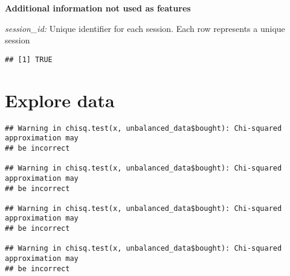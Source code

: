 \documentclass[
]{book}
\newenvironment{Shaded}{\begin{snugshade}}{\end{snugshade}}
\newcommand{\CommentTok}[1]{\textcolor[rgb]{0.56,0.35,0.01}{\textit{#1}}}
\newcommand{\ControlFlowTok}[1]{\textcolor[rgb]{0.13,0.29,0.53}{\textbf{#1}}}
\newcommand{\FunctionTok}[1]{\textcolor[rgb]{0.00,0.00,0.00}{#1}}
\newcommand{\NormalTok}[1]{#1}
\newcommand{\OtherTok}[1]{\textcolor[rgb]{0.56,0.35,0.01}{#1}}
\newcommand{\SpecialCharTok}[1]{\textcolor[rgb]{0.00,0.00,0.00}{#1}}
\begin{document}
\textbf{Additional information not used as features}

\emph{session\_id:} Unique identifier for each session. Each row represents a unique session

\begin{Shaded}
\end{Shaded}

\begin{verbatim}
## [1] TRUE
\end{verbatim}

\hypertarget{explore-data}{%
\section{Explore data}\label{explore-data}}

\begin{Shaded}
\end{Shaded}

\begin{verbatim}
## Warning in chisq.test(x, unbalanced_data$bought): Chi-squared approximation may
## be incorrect

## Warning in chisq.test(x, unbalanced_data$bought): Chi-squared approximation may
## be incorrect

## Warning in chisq.test(x, unbalanced_data$bought): Chi-squared approximation may
## be incorrect

## Warning in chisq.test(x, unbalanced_data$bought): Chi-squared approximation may
## be incorrect
\end{verbatim}

\begin{Shaded}
\end{Shaded}
\end{document}
